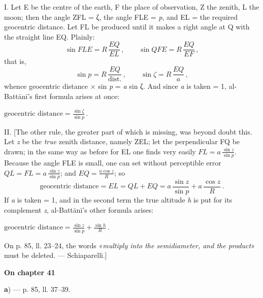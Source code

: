 \documentclass[11pt]{article}
\newcommand{\UnitHead}[2]{\par\setcounter{footnoteT}{0}\needspace{8\baselineskip}\bigskip\pdfbookmark[1]{#1}{unit-#2}\hypertarget{EN-#2}{}%
 {\large\bfseries\interlinepenalty=10000 #1\par}\nobreak\medskip}
\begin{document}
\begin{center}\end{center}
\par I. Let E be the centre of the earth, F the place of observation, Z the zenith, L the moon; then the angle ZFL = {\greekfont ζ}, the angle FLE = \emph{p}, and EL = the required geocentric distance. Let FL be produced until it makes a right angle at Q with the straight line EQ. Plainly: \[ \sin FLE = R\,\frac{EQ}{EL}\,, \qquad \sin QFE = R\,\frac{EQ}{EF}\,, \] that is, \[ \sin p = R\,\frac{EQ}{\text{dist.}}\,, \qquad \sin\zeta = R\,\frac{EQ}{a}\,, \] whence geocentric distance × sin \emph{p} = \emph{a} sin {\greekfont ζ}. And since \emph{a} is taken = 1, al-Battānī's first formula arises at once: \par\noindent\hspace*{1.5em}$\displaystyle \text{geocentric distance} = \frac{\sin\zeta}{\sin p}\,.$\par\par
\begin{center}\end{center}
\par II. [The other rule, the greater part of which is missing, was beyond doubt this. Let \emph{z} be the \emph{true} zenith distance, namely ZEL; let the perpendicular FQ be drawn; in the same way as before for EL one finds very easily $FL = a\,\frac{\sin z}{\sin p}$. Because the angle FLE is small, one can set without perceptible error $QL = FL = a\,\frac{\sin z}{\sin p}$; and $EQ = \frac{a\cos z}{R}$; so \[ \text{geocentric distance} = EL = QL + EQ = a\,\frac{\sin z}{\sin p} + a\,\frac{\cos z}{R}\,. \] If \emph{a} is taken = 1, and in the second term the true altitude \emph{h} is put for its complement \emph{z}, al-Battānī's other formula arises: \par\noindent\hspace*{1.5em}$\displaystyle \text{geocentric distance} = \frac{\sin z}{\sin p} + \frac{\sin h}{R}\,.$\par On p. 85, ll. 23–24, the words «\emph{multiply into the semidiameter, and the product}» must be deleted. — Schiaparelli.]\par
\UnitHead{On chapter 41}{A41}
\par\begin{center}\textbf{a}) — p. 85, ll. 37–39.\end{center}
\end{document}
